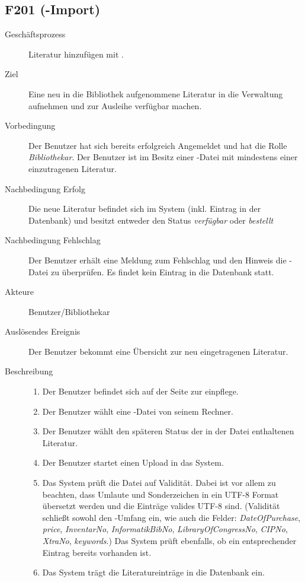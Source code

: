 \subsection{F201 (\BibTeX-Import)}
\begin{description}
  \item[Geschäftsprozess]Literatur hinzufügen mit \BibTeX.
  \item[Ziel]Eine neu in die Bibliothek aufgenommene Literatur in die Verwaltung aufnehmen und zur Ausleihe verfügbar machen.
  \item[Vorbedingung]Der Benutzer hat sich bereits erfolgreich Angemeldet und hat die Rolle \emph{Bibliothekar}. Der Benutzer ist im Besitz einer \BibTeX -Datei mit mindestens einer einzutragenen Literatur.
  \item[Nachbedingung Erfolg]Die neue Literatur befindet sich im System (inkl. Eintrag in der Datenbank) und besitzt entweder den Status \emph{verfügbar} oder \emph{bestellt}
  \item[Nachbedingung Fehlschlag]Der Benutzer erhält eine Meldung zum Fehlschlag und den Hinweis die \BibTeX -Datei zu überprüfen. Es findet kein Eintrag in die Datenbank statt.
  \item[Akteure]Benutzer/Bibliothekar
  \item[Auslösendes Ereignis]Der Benutzer bekommt eine Übersicht zur neu eingetragenen Literatur.
  \item[Beschreibung]
    \begin{enumerate}
      \item Der Benutzer befindet sich auf der Seite zur \BibTeX einpflege.
      \item Der Benutzer wählt eine \BibTeX -Datei von seinem Rechner.
      \item Der Benutzer wählt den späteren Status der in der Datei enthaltenen Literatur.
      \item Der Benutzer startet einen Upload in das System.
      \item Das System prüft die Datei auf Validität. Dabei ist vor allem zu beachten, dass Umlaute und Sonderzeichen in ein UTF-8 Format übersetzt werden und die Einträge valides UTF-8 sind.
	(Validität schließt sowohl den \BibTeX -Umfang ein, wie auch die Felder: \emph{DateOfPurchase}, \emph{price}, \emph{InventarNo}, \emph{InformatikBibNo}, \emph{LibraryOfCongressNo}, \emph{CIPNo}, \emph{XtraNo}, \emph{keywords}.)
	Das System prüft ebenfalls, ob ein entsprechender Eintrag bereits vorhanden ist.
      \item Das System trägt die Literatureinträge in die Datenbank ein.

\end{enumerate}
\end{description}
